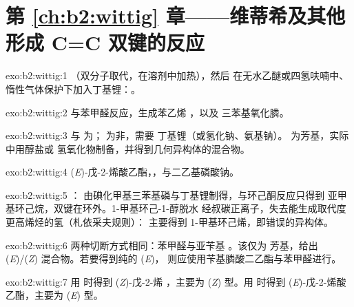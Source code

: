 \section*{第 \ref{ch:b2:wittig} 章——维蒂希及其他形成 C=C 双键的反应}

\begin{solution}{exo:b2:wittig:1}
（双分子取代，在溶剂中加热），然后
在无水乙醚或四氢呋喃中、惰性气体保护下加入丁基锂：。
\end{solution}

\begin{solution}{exo:b2:wittig:2}
  与苯甲醛反应，生成苯乙烯 ，以及
三苯基氧化膦。
\end{solution}

\begin{solution}{exo:b2:wittig:3}
 与  为； 为非，需要
丁基锂（或氢化钠、氨基钠）。 为芳基，实际中用醇盐或
氢氧化物制备，并得到几何异构体的混合物。
\end{solution}

\begin{solution}{exo:b2:wittig:4}
(\textit{E})-戊-2-烯酸乙酯，，与二乙基磷酸钠。
\end{solution}

\begin{solution}{exo:b2:wittig:5}
：  由碘化甲基三苯基磷与丁基锂制得，与环己酮反应只得到
亚甲基环己烷，双键在环外。1-甲基环己-1-醇脱水
经叔碳正离子，失去能生成取代度更高烯烃的氢（札依采夫规则）：
主要得到 1-甲基环己烯，即错误的异构体。
\end{solution}

\begin{solution}{exo:b2:wittig:6}
两种切断方式相同：苯甲醛与亚苄基 。该仅为
芳基，给出 (\textit{E})/(\textit{Z}) 混合物。若要得到纯的 (\textit{E})，
则应使用苄基膦酸二乙酯与苯甲醛进行。
\end{solution}

\begin{solution}{exo:b2:wittig:7}
用  时得到 (\textit{Z})-戊-2-烯 ，主要为 (\textit{Z}) 型。用
 时得到 (\textit{E})-戊-2-烯酸乙酯，主要为 (\textit{E}) 型。
\end{solution}

